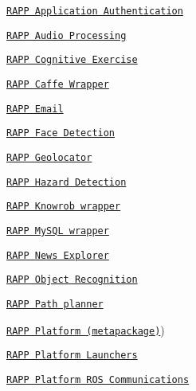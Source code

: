 \begin{DoxyItemize}
\item \href{https://github.com/rapp-project/rapp-platform/wiki/RAPP-Application-Authentication}{\tt R\-A\-P\-P Application Authentication}
\item \href{https://github.com/rapp-project/rapp-platform/wiki/RAPP-Audio-Processing}{\tt R\-A\-P\-P Audio Processing}
\item \href{https://github.com/rapp-project/rapp-platform/wiki/RAPP-Cognitive-Exercise}{\tt R\-A\-P\-P Cognitive Exercise}
\item \href{https://github.com/rapp-project/rapp-platform/wiki/RAPP-Caffe-Wrapper}{\tt R\-A\-P\-P Caffe Wrapper}
\item \href{https://github.com/rapp-project/rapp-platform/wiki/RAPP-Email}{\tt R\-A\-P\-P Email}
\item \href{https://github.com/rapp-project/rapp-platform/wiki/RAPP-Face-Detection}{\tt R\-A\-P\-P Face Detection}
\item \href{https://github.com/rapp-project/rapp-platform/wiki/RAPP-Geolocator}{\tt R\-A\-P\-P Geolocator}
\item \href{https://github.com/rapp-project/rapp-platform/wiki/RAPP-Hazard-Detection}{\tt R\-A\-P\-P Hazard Detection}
\item \href{https://github.com/rapp-project/rapp-platform/wiki/RAPP-Knowrob-wrapper}{\tt R\-A\-P\-P Knowrob wrapper}
\item \href{https://github.com/rapp-project/rapp-platform/wiki/RAPP-MySQL-wrapper}{\tt R\-A\-P\-P My\-S\-Q\-L wrapper}
\item \href{https://github.com/rapp-project/rapp-platform/wiki/RAPP-News-Explorer}{\tt R\-A\-P\-P News Explorer}
\item \href{https://github.com/rapp-project/rapp-platform/wiki/RAPP-Object-Recognition}{\tt R\-A\-P\-P Object Recognition}
\item \href{https://github.com/rapp-project/rapp-platform/wiki/RAPP-Path-planner}{\tt R\-A\-P\-P Path planner}
\item \href{https://github.com/rapp-project/rapp-platform/wiki/RAPP-Platform-(metapackage}{\tt R\-A\-P\-P Platform (metapackage)})
\item \href{https://github.com/rapp-project/rapp-platform/wiki/RAPP-Platform-Launchers}{\tt R\-A\-P\-P Platform Launchers}
\item \href{https://github.com/rapp-project/rapp-platform/wiki/RAPP-Platform-ROS-Communications}{\tt R\-A\-P\-P Platform R\-O\-S Communications}

\end{DoxyItemize}
